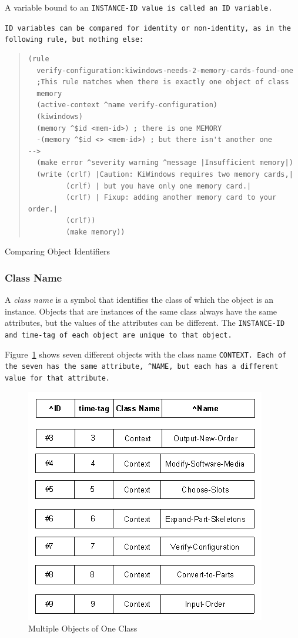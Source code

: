 A variable bound to an \tt{INSTANCE-ID} value is called an \tt{ID}
variable.

\tt{ID} variables can be compared for identity or non-identity,
as in the following rule, but nothing else:

\begin{example}[h]
\begin{quote}
\begin{verbatim}
(rule
  verify-configuration:kiwindows-needs-2-memory-cards-found-one
  ;This rule matches when there is exactly one object of class
  memory
  (active-context ^name verify-configuration)
  (kiwindows)
  (memory ^$id <mem-id>) ; there is one MEMORY
  -(memory ^$id <> <mem-id>) ; but there isn't another one
-->
  (make error ^severity warning ^message |Insufficient memory|)
  (write (crlf) |Caution: KiWindows requires two memory cards,|
         (crlf) | but you have only one memory card.|
         (crlf) | Fixup: adding another memory card to your order.|
         (crlf))
         (make memory))
\end{verbatim}
\end{quote}
\caption{Comparing Object Identifiers}
\end{example}

\subsubsection*{Class Name}

A \emph{class name} is a symbol that identifies the class of which the
object is an instance. Objects that are instances of the same class
always have the same attributes, but the values of the attributes can
be different. The \tt{INSTANCE-ID} and time-tag of each object are
unique to that object.

Figure~\ref{f:2-4} shows seven different objects with the class name
\tt{CONTEXT}. Each of the seven has the same attribute, \verb|^NAME|,
but each has a different value for that attribute.

\begin{figure}[h]
  \centering
  \includegraphics[scale=0.7]{f2-4}
  \caption{Multiple Objects of One Class}
  \label{f:2-4}
\end{figure}

